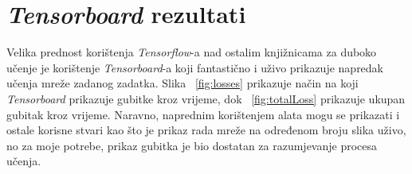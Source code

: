 \section{\emph{Tensorboard} rezultati}
Velika prednost korištenja \emph{Tensorflow}-a nad ostalim knjižnicama za duboko učenje je korištenje \emph{Tensorboard}-a koji fantastično i uživo prikazuje napredak učenja mreže zadanog zadatka.
Slika ~\ref{fig:losses} prikazuje način na koji \emph{Tensorboard} prikazuje gubitke kroz vrijeme, dok ~\ref{fig:totalLoss} prikazuje ukupan gubitak kroz vrijeme.
Naravno, naprednim korištenjem alata mogu se prikazati i ostale korisne stvari kao što je prikaz rada mreže na određenom broju slika uživo, no za moje potrebe, prikaz gubitka je bio dostatan za razumjevanje procesa učenja.
\begin{figure}
	 \\
\end{figure}
